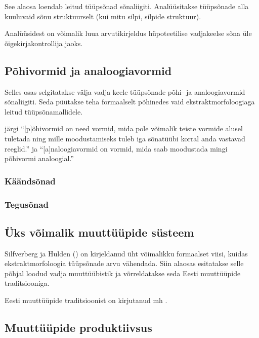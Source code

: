 \documentclass[12pt,a4paper]{article}
\begin{document}
See alaosa loendab leitud tüüpsõnad sõnaliigiti. Analüüsitakse tüüpsõnade alla kuuluvaid sõnu struktuurselt (kui mitu silpi, silpide struktuur).

Analüüsidest on võimalik luua arvutikirjeldus hüpoteetilise vadjakeelse sõna üle õigekirjakontrollija jaoks.


\subsection{Põhivormid ja analoogiavormid}

Selles osas selgitatakse välja vadja keele tüüpsõnade põhi- ja analoogiavormid sõnaliigiti. Seda püütakse teha formaalselt põhinedes vaid ekstrakt\-morfoloogiaga leitud tüüpsõnamallidele.

\cite{erelt_eesti_2007} järgi ``[p]õhivormid on need vormid, mida pole võimalik teiste vormide alusel tuletada ning mille moodustamiseks tuleb iga sõnatüübi korral anda vastavad reeglid.'' ja ``[a]naloogiavormid on vormid, mida saab moodustada mingi põhivormi analoogial.''




\subsubsection{Käändsõnad}

\subsubsection{Tegusõnad}


\subsection{Üks võimalik muuttüüpide süsteem}

Silfverberg ja Hulden (\citeyear{silfverberg_computational_nodate}) on kirjeldanud üht võimalikku formaalset viisi, kuidas ekstrakt\-morfoloogia tüüpsõnade arvu vähendada. Siin alaosas esitatakse selle põhjal loodud vadja muuttüübistik ja võrreldatakse seda Eesti muuttüüpide traditsiooniga.

Eesti muuttüüpide traditsioonist on kirjutanud mh \cite{viks_muuttuubid_nodate}.


\subsection{Muuttüüpide produktiivsus}
\end{document}
